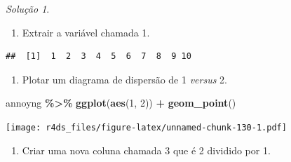 \documentclass[
]{latex/krantz}
\newenvironment{Shaded}{\begin{snugshade}}{\end{snugshade}}
\newcommand{\AttributeTok}[1]{\textcolor[rgb]{0.13,0.29,0.53}{#1}}
\newcommand{\FunctionTok}[1]{\textcolor[rgb]{0.13,0.29,0.53}{\textbf{#1}}}
\newcommand{\NormalTok}[1]{#1}
\newcommand{\OtherTok}[1]{\textcolor[rgb]{0.56,0.35,0.01}{#1}}
\newcommand{\SpecialCharTok}[1]{\textcolor[rgb]{0.81,0.36,0.00}{\textbf{#1}}}
\newcommand{\StringTok}[1]{\textcolor[rgb]{0.31,0.60,0.02}{#1}}
\providecommand{\tightlist}{%
  \setlength{\itemsep}{0pt}\setlength{\parskip}{0pt}}
\theoremstyle{definition}
\theoremstyle{definition}
\theoremstyle{definition}
\theoremstyle{definition}
\theoremstyle{remark}
\newtheorem*{solution}{Solução}
\begin{document}
\begin{solution}
\leavevmode

\begin{enumerate}
\def\labelenumi{\alph{enumi}.}
\tightlist
\item
  Extrair a variável chamada 1.
\end{enumerate}

\begin{Shaded}
\end{Shaded}

\begin{verbatim}
##  [1]  1  2  3  4  5  6  7  8  9 10
\end{verbatim}

\begin{enumerate}
\def\labelenumi{\alph{enumi}.}
\setcounter{enumi}{1}
\tightlist
\item
  Plotar um diagrama de dispersão de 1 \emph{versus} 2.
\end{enumerate}

\begin{Shaded}
\begin{Highlighting}[]
\NormalTok{annoyng }\SpecialCharTok{\%\textgreater{}\%}
    \FunctionTok{ggplot}\NormalTok{(}\FunctionTok{aes}\NormalTok{(}\StringTok{\textasciigrave{}}\AttributeTok{1}\StringTok{\textasciigrave{}}\NormalTok{, }\StringTok{\textasciigrave{}}\AttributeTok{2}\StringTok{\textasciigrave{}}\NormalTok{)) }\SpecialCharTok{+}
        \FunctionTok{geom\_point}\NormalTok{()}
\end{Highlighting}
\end{Shaded}

\texttt{[image: r4ds\_files/figure-latex/unnamed-chunk-130-1.pdf]}

\begin{enumerate}
\def\labelenumi{\alph{enumi}.}
\setcounter{enumi}{2}
\tightlist
\item
  Criar uma nova coluna chamada 3 que é 2 dividido por 1.
\end{enumerate}

\begin{Shaded}
\end{Shaded}


\end{solution}
\end{document}
